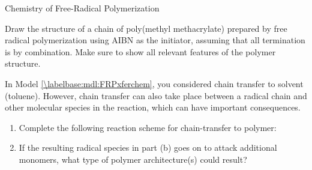 \begin{activity}{Chemistry of Free-Radical Polymerization}
\begin{exercises}
	\exercise Draw the structure of a chain of poly(methyl methacrylate) prepared by free radical polymerization using AIBN as the initiator, assuming that all termination is by combination.  Make sure to show all relevant features of the polymer structure.
	
		\begin{solution}\end{solution}
	
	\exercise In Model \ref{\labelbase:mdl:FRPxferchem}, you considered chain transfer to solvent (toluene).  However, chain transfer can also take place between a radical chain and other molecular species in the reaction, which can have important consequences.
	
		\begin{enumerate}
			
			\item Complete the following reaction scheme for chain-transfer to polymer:
	
			\begin{solution}\end{solution}
			
			\item If the resulting radical species in part (b) goes on to attack additional monomers, what type of polymer architecture(s) could result?
			
				\begin{solution}\end{solution}
		\end{enumerate}
		
	
\end{exercises}


%
%	


	
\end{activity}